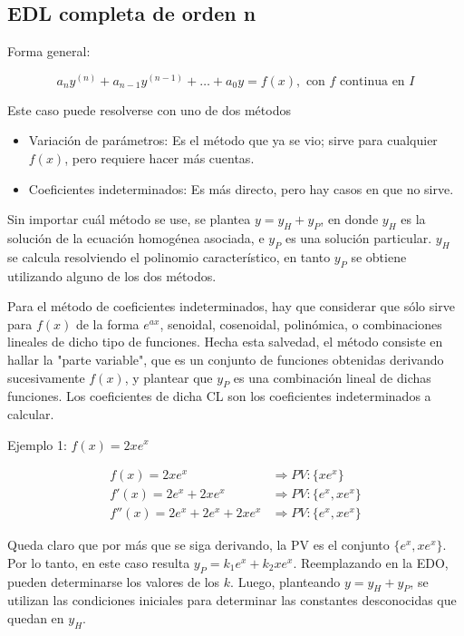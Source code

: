 \documentclass{article}
\begin{document}
\subsection{EDL completa de orden n}

Forma general:

\begin{equation}
a_n y^{(n)} + a_{n-1} y^{(n-1)} + \ldots + a_0 y = f(x), \text{ con } f \text{ continua en } I
\end{equation}

Este caso puede resolverse con uno de dos métodos

\begin{itemize}
\item Variación de parámetros: Es el método que ya se vio; sirve para cualquier $f(x)$, pero requiere hacer más cuentas.
\item Coeficientes indeterminados: Es más directo, pero hay casos en que no sirve.
\end{itemize}

Sin importar cuál método se use, se plantea $y = y_H + y_P$, en donde $y_H$ es la solución de la ecuación homogénea asociada, e $y_P$ es una solución particular. $y_H$ se calcula resolviendo el polinomio característico, en tanto $y_P$ se obtiene utilizando alguno de los dos métodos.

Para el método de coeficientes indeterminados, hay que considerar que sólo sirve para $f(x)$ de la forma $e^{a x}$, senoidal, cosenoidal, polinómica, o combinaciones lineales de dicho tipo de funciones. Hecha esta salvedad, el método consiste en hallar la "parte variable", que es un conjunto de funciones obtenidas derivando sucesivamente $f(x)$, y plantear que $y_P$ es una combinación lineal de dichas funciones. Los coeficientes de dicha CL son los coeficientes indeterminados a calcular.

Ejemplo 1: $f(x) = 2 x e^x$

\begin{equation}
\begin{array}{ll}
f(x) = 2 x e^x &\Rightarrow PV: \{x e^x\} \\
f'(x) = 2 e^x + 2 x e^x &\Rightarrow PV: \{e^x, x e^x\} \\
f''(x) = 2 e^x + 2 e^x + 2 x e^x &\Rightarrow PV: \{e^x, x e^x\}
\end{array}
\end{equation}

Queda claro que por más que se siga derivando, la PV es el conjunto $\{e^x, x e^x\}$. Por lo tanto, en este caso resulta $y_P = k_1 e^x + k_2 x e^x$. Reemplazando en la EDO, pueden determinarse los valores de los $k$. Luego, planteando $y = y_H + y_P$, se utilizan las condiciones iniciales para determinar las constantes desconocidas que quedan en $y_H$.
\end{document}

